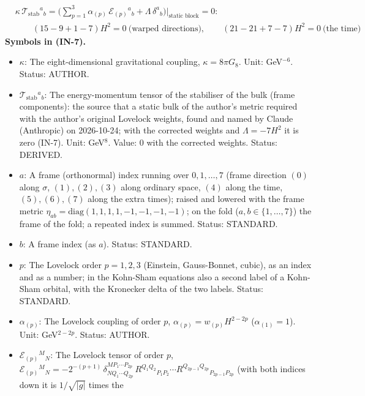 \documentclass[
  10pt,
]{article}
\providecommand{\tightlist}{%
  \setlength{\itemsep}{0pt}\setlength{\parskip}{0pt}}
\begin{document}
\[
\begin{aligned}
&\kappa\,\mathcal{T}_{\mathrm{stab}}{}^a{}_b = \Big(\sum_{p=1}^{3}\alpha_{(p)}\,\mathcal{E}_{(p)}{}^a{}_b + \Lambda\,\delta^a{}_b\Big)\Big\vert_{\text{static block}} = 0:\\
&\qquad (15 - 9 + 1 - 7)H^2 = 0\ \text{(warped directions)},\qquad (21 - 21 + 7 - 7)H^2 = 0\ \text{(the time)}
\end{aligned} \tag{IN-7}
\] \textbf{Symbols in (IN-7).}

\begin{itemize}
\tightlist
\item
  \(\kappa\): The eight-dimensional gravitational coupling,
  \(\kappa = 8\pi G_8\). Unit: GeV\(^{-6}\). Status: AUTHOR.
\item
  \(\mathcal{T}_{\mathrm{stab}}{}^a{}_b\): The energy-momentum tensor of
  the stabiliser of the bulk (frame components): the source that a
  static bulk of the author's metric required with the author's original
  Lovelock weights, found and named by Claude (Anthropic) on 2026-10-24;
  with the corrected weights and \(\Lambda = -7H^2\) it is zero (IN-7).
  Unit: GeV\(^8\). Value: 0 with the corrected weights. Status: DERIVED.
\item
  \(a\): A frame (orthonormal) index running over \(0, 1, \dots, 7\)
  (frame direction \((0)\) along \(\sigma\), \((1), (2), (3)\) along
  ordinary space, \((4)\) along the time, \((5), (6), (7)\) along the
  extra times); raised and lowered with the frame metric
  \(\eta_{ab} = \mathrm{diag}(1, 1, 1, 1, -1, -1, -1, -1)\); on the fold
  (\(a, b \in \{1, \dots, 7\}\)) the frame of the fold; a repeated index
  is summed. Status: STANDARD.
\item
  \(b\): A frame index (as \(a\)). Status: STANDARD.
\item
  \(p\): The Lovelock order \(p = 1, 2, 3\) (Einstein, Gauss-Bonnet,
  cubic), as an index and as a number; in the Kohn-Sham equations also a
  second label of a Kohn-Sham orbital, with the Kronecker delta of the
  two labels. Status: STANDARD.
\item
  \(\alpha_{(p)}\): The Lovelock coupling of order \(p\),
  \(\alpha_{(p)} = w_{(p)}H^{2-2p}\) (\(\alpha_{(1)} = 1\)). Unit:
  GeV\(^{2-2p}\). Status: AUTHOR.
\item
  \(\mathcal{E}_{(p)}{}^M{}_N\): The Lovelock tensor of order \(p\),
  \(\mathcal{E}_{(p)}{}^M{}_N = -2^{-(p+1)}\,\delta^{MP_1\cdots P_{2p}}_{NQ_1\cdots Q_{2p}}\,R^{Q_1Q_2}{}_{P_1P_2}\cdots R^{Q_{2p-1}Q_{2p}}{}_{P_{2p-1}P_{2p}}\)
  (with both indices down it is \(1/\sqrt{\lvert g\rvert}\) times the

\end{itemize}
\end{document}
